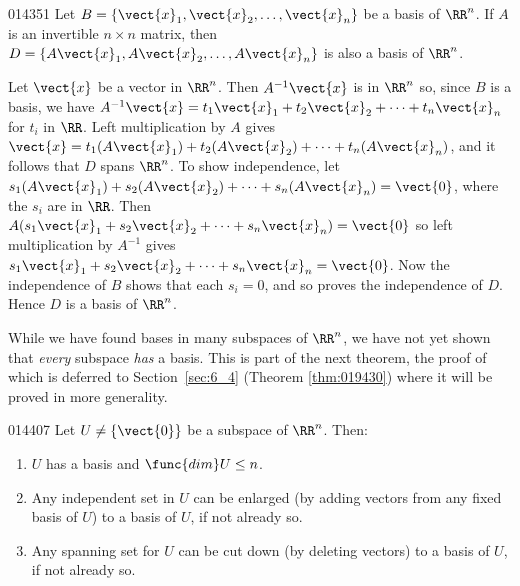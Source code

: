 \begin{example}{}{014351}
Let $B = \{\vect{x}_{1}, \vect{x}_{2}, \dots, \vect{x}_{n}\}$ be a basis of $\RR^n$. If $A$ is an invertible $n \times n$ matrix, then $D = \{A\vect{x}_{1}, A\vect{x}_{2}, \dots, A\vect{x}_{n}\}$ is also a basis of $\RR^n$.

\begin{solution}
Let $\vect{x}$ be a vector in $\RR^n$. Then $A^{-1}\vect{x}$ is in $\RR^n$ so, since $B$ is a basis, we have $A^{-1}\vect{x} = t_{1}\vect{x}_{1} + t_{2}\vect{x}_{2} + \dots + t_{n}\vect{x}_{n}$ for $t_{i}$ in $\RR$. Left multiplication by $A$ gives $\vect{x} = t_{1}(A\vect{x}_{1}) + t_{2}(A\vect{x}_{2}) + \dots + t_{n}(A\vect{x}_{n})$, and it follows that $D$ spans $\RR^n$. To show independence, let $s_{1}(A\vect{x}_{1}) + s_{2}(A\vect{x}_{2}) + \dots + s_{n}(A\vect{x}_{n}) = \vect{0}$, where the $s_{i}$ are in $\RR$. Then $A(s_{1}\vect{x}_{1} + s_{2}\vect{x}_{2} + \dots + s_{n}\vect{x}_{n}) = \vect{0}$ so left multiplication by $A^{-1}$ gives $s_{1}\vect{x}_{1} + s_{2}\vect{x}_{2} + \dots + s_{n}\vect{x}_{n} = \vect{0}$. Now the independence of $B$ shows that each $s_{i} = 0$, and so proves the independence of $D$. Hence $D$ is a basis of $\RR^n$.
\end{solution}
\end{example}

While we have found bases in many subspaces of $\RR^n$, we have not yet shown that \textit{every} subspace \textit{has} a basis. This is part of the next theorem, the proof of which is deferred to Section~\ref{sec:6_4} (Theorem \ref{thm:019430}) where it will be proved in more generality.

\begin{theorem}{}{014407} %
Let $U \neq \{\normalfont{\vect{0}}\}$ be a subspace of $\RR^n$. Then:

\begin{enumerate}
\item $U$ has a basis and $\func{dim} U \leq n$.

\item Any independent set in $U$ can be enlarged (by adding vectors from any fixed basis of $U$) to a basis of $U$, if not already so.

\item Any spanning set for $U$ can be cut down (by deleting vectors) to a basis of $U$, if not already so.
\end{enumerate}
\end{theorem}

